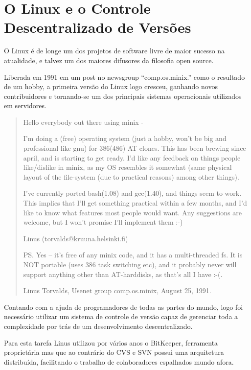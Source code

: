 \section{O Linux e o Controle Descentralizado de Versões}

O Linux é de longe um dos projetos de software livre de maior sucesso na
atualidade, e talvez um dos maiores difusores da filosofia open source.

Liberada em 1991 em um post no newsgroup ``comp.os.minix.'' como o resultado
de um hobby, a primeira versão do Linux logo cresceu, ganhando novos
contribuidores e tornando-se um dos principais sistemas operacionais utilizados
em servidores.

\begin{quote}

Hello everybody out there using minix -

I'm doing a (free) operating system (just a hobby, won't be big and professional like gnu) for 386(486) AT clones. This has been brewing since april, and is starting to get ready. I'd like any feedback on things people like/dislike in minix, as my OS resembles it somewhat (same physical layout of the file-system (due to practical reasons) among other things).

I've currently ported bash(1.08) and gcc(1.40), and things seem to work. This implies that I'll get something practical within a few months, and I'd like to know what features most people would want. Any suggestions are welcome, but I won't promise I'll implement them :-)

Linus (torvalds@kruuna.helsinki.fi)

PS. Yes – it's free of any minix code, and it has a multi-threaded fs. It is NOT portable (uses 386 task switching etc), and it probably never will support anything other than AT-harddisks, as that's all I have :-(.

Linus Torvalds, Usenet group comp.os.minix, August 25, 1991.

\end{quote}

Contando com a ajuda de programadores de todas as partes do mundo, logo
foi necessário utilizar um sistema de controle de versão capaz de gerenciar
toda a complexidade por trás de um desenvolvimento descentralizado.

Para esta tarefa Linus utilizou por vários anos o BitKeeper, ferramenta
proprietária mas que ao contrário do CVS e SVN possui uma arquitetura distribuída,
facilitando o trabalho de colaboradores espalhados mundo afora.

